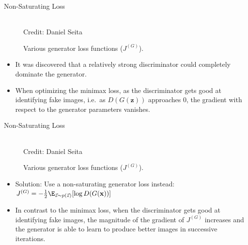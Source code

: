 \begin{frame} {Non-Saturating Loss}
  \begin{figure}
    \centering
      \tiny{\\Credit: Daniel Seita}
      \caption{\footnotesize Various generator loss functions ($J^{(G)}$).}
  \end{figure}
  \begin{itemize}
    \item It was discovered that a relatively strong discriminator could completely dominate the generator.
    \item %
   When optimizing the minimax loss, as the discriminator gets good at identifying fake images, i.e.~as $D(G(\mathbf{z}))$ approaches 0, the gradient with respect to the generator parameters vanishes.

  \end{itemize}
\end{frame}

\begin{frame} {Non-Saturating Loss}
  \begin{figure}
    \centering
      \tiny{\\Credit: Daniel Seita}
      \caption{\footnotesize Various generator loss functions ($J^{(G)}$).}
  \end{figure}
  \begin{itemize}
    \item Solution: Use a non-saturating generator loss instead:  $J^{(G)} = - \frac{1}{2} \E_{\vec z \sim p(\vec z)} [\log D(G(\mathbf{x}))]$
    \item In contrast to the minimax loss, when the discriminator gets good at identifying fake images, the magnitude of the gradient of $J^{(G)}$ increases and the generator is able to learn to produce better images in successive iterations.
  \end{itemize}
\end{frame}


